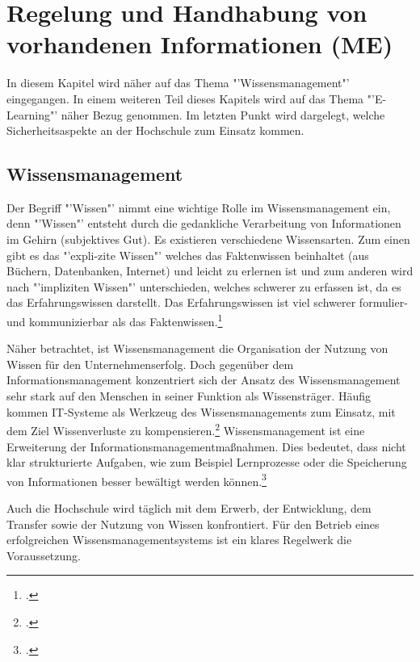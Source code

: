 \section{Regelung und Handhabung von vorhandenen Informationen (ME)}

In diesem Kapitel wird näher auf das Thema "'Wissensmanagement"' eingegangen. In einem weiteren Teil dieses Kapitels wird auf das Thema "'E-Learning"' näher Bezug genommen. Im letzten Punkt wird dargelegt, welche Sicherheitsaspekte an der Hochschule zum Einsatz kommen.

\subsection{Wissensmanagement}

Der Begriff "'Wissen"' nimmt eine wichtige Rolle im Wissensmanagement ein, denn "'Wissen"' entsteht durch die 
gedankliche Verarbeitung von Informationen im Gehirn (subjektives Gut). Es existieren verschiedene Wissensarten. 
Zum einen gibt es das "'expli-zite Wissen"' welches das Faktenwissen beinhaltet (aus Büchern, Datenbanken, Internet) 
und leicht zu erlernen ist und zum anderen wird nach "'impliziten Wissen"' unterschieden, welches schwerer zu 
erfassen ist, da es das Erfahrungswissen darstellt. Das Erfahrungswissen ist viel schwerer formulier- und 
kommunizierbar als das Faktenwissen.\footcite[Vgl.][]{wissensmangement_infowiss.net_2009}

Näher betrachtet, ist Wissensmanagement die Organisation der Nutzung von Wissen für den Unternehmenserfolg. 
Doch gegenüber dem Informationsmanagement konzentriert sich der Ansatz des Wissensmanagement sehr stark auf 
den Menschen in seiner Funktion als Wissensträger. Häufig kommen IT-Systeme als Werkzeug des 
Wissensmanagements zum Einsatz, mit dem Ziel Wissenverluste zu kompensieren.\footcite[Vgl.][]{wissensmangement_infowiss.net_2009} Wissensmanagement ist eine 
Erweiterung der Informationsmanagementmaßnahmen. Dies bedeutet, dass nicht klar strukturierte Aufgaben, wie zum 
Beispiel Lernprozesse oder die Speicherung von Informationen besser bewältigt werden können.\footcite[Vgl.][]{wissensmangement_vfhinf.oncampus.de_2013}

Auch die Hochschule wird täglich mit dem Erwerb, der Entwicklung, dem Transfer sowie der Nutzung von 
Wissen konfrontiert. Für den Betrieb eines erfolgreichen Wissensmanagementsystems ist ein klares Regelwerk die Voraussetzung. 

